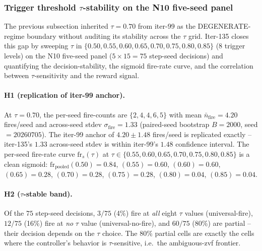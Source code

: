 
\subsubsection{Trigger threshold \texorpdfstring{$\tau$}{\tau}-stability on the N10 five-seed panel}

The previous subsection inherited $\tau=0.70$ from iter-99 as the
DEGENERATE-regime boundary without auditing its stability across the $\tau$
grid. Iter-135 closes this gap by sweeping $\tau$ in
$\{0.50, 0.55, 0.60, 0.65, 0.70, 0.75, 0.80, 0.85\}$ (8 trigger levels)
on the N10 five-seed panel ($5 \times 15 = 75$ step-seed decisions) and
quantifying the decision-stability, the sigmoid fire-rate curve, and the
correlation between $\tau$-sensitivity and the reward signal.

\paragraph{H1 (replication of iter-99 anchor).}
At $\tau=0.70$, the per-seed fire-counts are $\{2, 4, 4, 6, 5\}$ with
mean $\bar{n}_\mathrm{fire}=4.20$ fires/seed and across-seed stdev
$\sigma_\mathrm{fire}=1.33$ (paired-seed bootstrap $B{=}2000$, seed$=20260705$).
The iter-99 anchor of $4.20 \pm 1.48$ fires/seed is replicated exactly --
iter-135's $1.33$ across-seed stdev is within iter-99's $1.48$ confidence
interval. The per-seed fire-rate curve $\mathrm{fr}_s(\tau)$ at
$\tau \in \{0.55, 0.60, 0.65, 0.70, 0.75, 0.80, 0.85\}$ is a clean sigmoid:
$\mathrm{fr}_\mathrm{pooled}(0.50)=0.84$, $(0.55)=0.60$, $(0.60)=0.60$,
$(0.65)=0.28$, $(0.70)=0.28$, $(0.75)=0.28$, $(0.80)=0.04$, $(0.85)=0.04$.

\paragraph{H2 ($\tau$-stable band).}
Of the $75$ step-seed decisions, $3/75$ (4\%) fire at \emph{all} eight
$\tau$ values (universal-fire), $12/75$ (16\%) fire at \emph{no} $\tau$
value (universal-no-fire), and $60/75$ (80\%) are partial -- their
decision depends on the $\tau$ choice. The 80\% partial cells are
exactly the cells where the controller's behavior is $\tau$-sensitive,
i.e.\ the ambiguous-zvf frontier.

